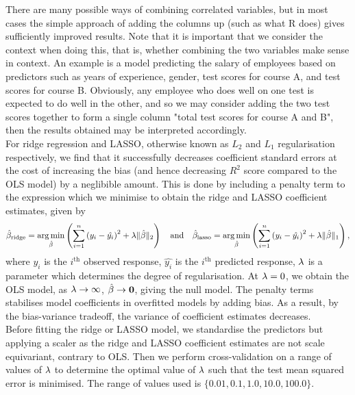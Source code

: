 \documentclass[12pt]{article}
\DeclareMathOperator*{\argmin}{arg\,min}
\newcommand{\gbh}{\hat{\gb}}
\begin{document}
	There are many possible ways of combining correlated variables, but in most cases the simple approach of adding the columns up (such as what R does) gives sufficiently improved results. Note that it is important that we consider the context when doing this, that is, whether combining the two variables make sense in context. An example is a model predicting the salary of employees based on predictors such as years of experience, gender, test scores for course A, and test scores for course B. Obviously, any employee who does well on one test is expected to do well in the other, and so we may consider adding the two test scores together to form a single column "total test scores for course A and B", then the results obtained may be interpreted accordingly.\\
	
	
	For ridge regression and LASSO, otherwise known as $L_2$ and $L_1$ regularisation respectively, we find that it successfully decreases coefficient standard errors at the cost of increasing the bias (and hence decreasing $R^2$ score compared to the OLS model) by a neglibible amount. This is done by including a penalty term to the expression which we minimise to obtain the ridge and LASSO coefficient estimates, given by
	$$\gbh_{\text{ridge}}=\argmin_{\gbh}\lt( \sum_{i=1}^{n}\lt(y_i-\hat{y_i}\rt)^2+\lm\|\gbh\|_2\rt) \quad \text{and}\quad \gbh_{\text{lasso}}=\argmin_{\gbh}\lt( \sum_{i=1}^{n}\lt(y_i-\hat{y_i}\rt)^2+\lm\|\gbh\|_1\rt),$$
	where $y_i$ is the $i^{\text{th}}$ observed response, $\hat{y_i}$ is the $i^{\text{th}}$ predicted response, $\lambda$ is a parameter which determines the degree of regularisation. At $\lambda=0$, we obtain the OLS model, as $\lambda\rightarrow\infty$, $\gbh\rightarrow \bzero$, giving the null model. The penalty terms stabilises model coefficients in overfitted models by adding bias. As a result, by the bias-variance tradeoff, the variance of coefficient estimates decreases.\\

	Before fitting the ridge or LASSO model, we standardise the predictors but applying a scaler as the ridge and LASSO coefficient estimates are not scale equivariant, contrary to OLS. Then we perform cross-validation on a range of values of $\lambda$ to determine the optimal value of $\lambda$ such that the test mean squared error is minimised. The range of values used is $\{0.01,0.1,1.0,10.0,100.0\}$. 
	
\end{document}
